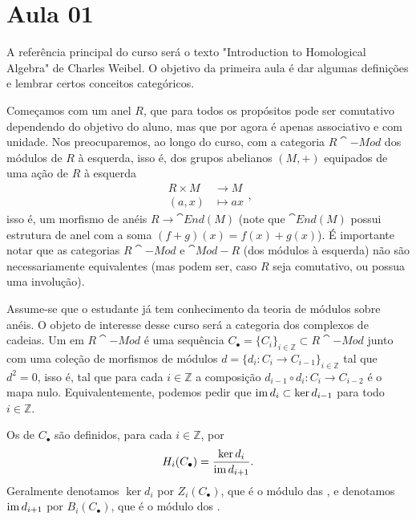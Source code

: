 \section{Aula 01}

A referência principal do curso será o texto "Introduction to Homological Algebra" de Charles Weibel. O objetivo da primeira aula é dar algumas definições e lembrar certos conceitos categóricos.

Começamos com um anel $R$, que para todos os propósitos pode ser comutativo dependendo do objetivo do aluno, mas que por agora é apenas associativo e com unidade. Nos preocuparemos, ao longo do curso, com a categoria $R\cat{-Mod}$ dos módulos de $R$ à esquerda, isso é, dos grupos abelianos $(M, +)$ equipados de uma ação de $R$ à esquerda \begin{equation}
    \begin{split}
        R \times M &\to M \\ (a, x) &\mapsto ax
    \end{split},
\end{equation} isso é, um morfismo de anéis $R \to \cat{End}(M)$ (note que $\cat{End}(M)$ possui estrutura de anel com a soma $(f + g)(x) = f(x) + g(x)$). É importante notar que as categorias $R\cat{-Mod}$ e $\cat{Mod-}R$ (dos módulos à esquerda) não são necessariamente equivalentes (mas podem ser, caso $R$ seja comutativo, ou possua uma involução).

Assume-se que o estudante já tem conhecimento da teoria de módulos sobre anéis. O objeto de interesse desse curso será a categoria dos complexos de cadeias. Um  em $R\cat{-Mod}$ é uma sequência $C_\bullet = \{C_i\}_{i \in \mathbb{Z}} \subset R\cat{-Mod}$ junto com uma coleção de morfismos de módulos $d = \{d_i \colon C_i \to C_{i-1}\}_{i \in \mathbb{Z}}$ tal que $d^2 = 0$, isso é, tal que para cada $i \in \mathbb{Z}$ a composição $d_{i - 1} \circ d_i \colon C_i \to C_{i - 2}$ é o mapa nulo. Equivalentemente, podemos pedir que $\operatorname{im} d_i \subset \ker d_{i - 1}$ para todo $i \in \mathbb{Z}$.

Os  de $C_\bullet$ são definidos, para cada $i \in \mathbb{Z}$, por \begin{equation}
    H_i(C_\bullet) = \frac{\ker d_i}{\operatorname{im} d_{i+1}}.
\end{equation} Geralmente denotamos $\ker d_i$ por $Z_i(C_\bullet)$, que é o módulo das , e denotamos $\operatorname{im} d_{i+1}$ por $B_i(C_\bullet)$, que é o módulo dos .

